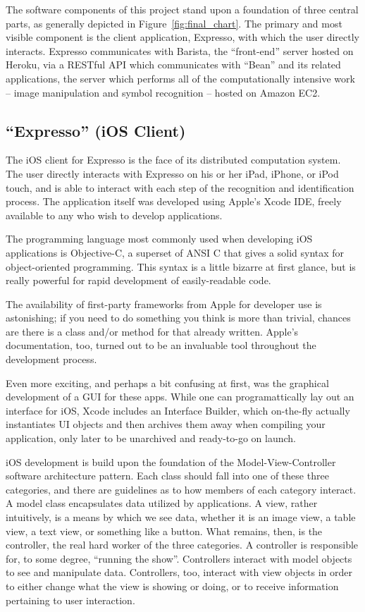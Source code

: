 \documentclass{acm_proc_article-sp}
\begin{document}
The software components of this project stand upon a foundation of three central parts, as generally depicted in Figure~\ref{fig:final_chart}. The primary and most visible component is the client application, Expresso, with which the user directly interacts. Expresso communicates with Barista, the ``front-end'' server hosted on Heroku, via a RESTful API which communicates with ``Bean'' and its related applications, the server which performs all of the computationally intensive work -- image manipulation and symbol recognition -- hosted on Amazon EC2.

\subsection{``Expresso'' (iOS Client)}
The iOS client for Expresso is the face of its distributed computation system. The user directly interacts with Expresso on his or her iPad, iPhone, or iPod touch, and is able to interact with each step of the recognition and identification process. The application itself was developed using Apple's Xcode IDE, freely available to any who wish to develop applications. 

The programming language most commonly used when developing iOS applications is Objective-C, a superset of ANSI C that gives a solid syntax for object-oriented programming. This syntax is a little bizarre at first glance, but is really powerful for rapid development of easily-readable code. 

The availability of first-party frameworks from Apple for developer use is astonishing; if you need to do something you think is more than trivial, chances are there is a class and/or method for that already written. Apple's documentation, too, turned out to be an invaluable tool throughout the development process. 

Even more exciting, and perhaps a bit confusing at first, was the graphical development of a GUI for these apps. While one can programattically lay out an interface for iOS, Xcode includes an Interface Builder, which on-the-fly actually instantiates UI objects and then archives them away when compiling your application, only later to be unarchived and ready-to-go on launch.

iOS development is build upon the foundation of the Model-View-Controller software architecture pattern. Each class should fall into one of these three categories, and there are guidelines as to how members of each category interact. A model class encapsulates data utilized by applications. A view, rather intuitively, is a means by which we see data, whether it is an image view, a table view, a text view, or something like a button. What remains, then, is the controller, the real hard worker of the three categories. A controller is responsible for, to some degree, ``running the show''. Controllers interact with model objects to see and manipulate data. Controllers, too, interact with view objects in order to either change what the view is showing or doing, or to receive information pertaining to user interaction.
\end{document}
